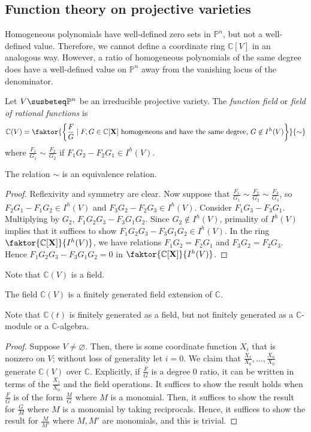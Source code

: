 \subsection{Function theory on projective varieties}
Homogeneous polynomials have well-defined zero sets in \( \mathbb P^n \), but not a well-defined value.
Therefore, we cannot define a coordinate ring \( \mathbb C[V] \) in an analogous way.
However, a ratio of homogeneous polynomials of the same degree does have a well-defined value on \( \mathbb P^n \) away from the vanishing locus of the denominator.
\begin{definition}
    Let \( V \susbeteq \mathbb P^n \) be an irreducible projective variety.
    The \emph{function field} or \emph{field of rational functions} is
    \[ \mathbb C(V) = \faktor{\qty{\frac{F}{G} \mid F, G \in \mathbb C[\vb X] \text{ homogeneous and have the same degree, } G \not\in I^h(V)}}{\sim} \]
    where \( \frac{F_1}{G_1} \sim \frac{F_2}{G_2} \) if \( F_1 G_2 - F_2 G_1 \in I^h(V) \).
\end{definition}
\begin{lemma}
    The relation \( \sim \) is an equivalence relation.
\end{lemma}
\begin{proof}
    Reflexivity and symmetry are clear.
    Now suppose that \( \frac{F_1}{G_1} \sim \frac{F_2}{G_2} \sim \frac{F_3}{G_3} \), so \( F_2 G_1 - F_1 G_2 \in I^h(V) \) and \( F_3 G_2 - F_2 G_3 \in I^h(V) \).
    Consider \( F_1 G_3 - F_3 G_1 \).
    Multiplying by \( G_2 \), \( F_1 G_2 G_3 - F_3 G_1 G_2 \).
    Since \( G_2 \not\in I^h(V) \), primality of \( I^h(V) \) implies that it suffices to show \( F_1 G_2 G_3 - F_3 G_1 G_2 \in I^h(V) \).
    In the ring \( \faktor{\mathbb C[\vb X]}{I^h(V)} \), we have relations \( F_1 G_2 = F_2 G_1 \) and \( F_3 G_2 = F_2 G_3 \).
    Hence \( F_1 G_2 G_3 - F_3 G_1 G_2 = 0 \) in \( \faktor{\mathbb C[\vb X]}{I^h(V)} \).
\end{proof}
Note that \( \mathbb C(V) \) is a field.
\begin{proposition}
    The field \( \mathbb C(V) \) is a finitely generated field extension of \( \mathbb C \).
\end{proposition}
Note that \( \mathbb C(t) \) is finitely generated as a field, but not finitely generated as a \( \mathbb C \)-module or a \( \mathbb C \)-algebra.
\begin{proof}
    Suppose \( V \neq \varnothing \).
    Then, there is some coordinate function \( X_i \) that is nonzero on \( V \); without loss of generality let \( i = 0 \).
    We claim that \( \frac{X_1}{X_0}, \dots, \frac{X_n}{X_0} \) generate \( \mathbb C(V) \) over \( \mathbb C \).
    Explicitly, if \( \frac{F}{G} \) is a degree 0 ratio, it can be written in terms of the \( \frac{X_j}{X_0} \) and the field operations.
    It suffices to show the result holds when \( \frac{F}{G} \) is of the form \( \frac{M}{G} \) where \( M \) is a monomial.
    Then, it suffices to show the result for \( \frac{G}{M} \) where \( M \) is a monomial by taking reciprocals.
    Hence, it suffices to show the result for \( \frac{M}{M'} \) where \( M, M' \) are monomials, and this is trivial.
\end{proof}
